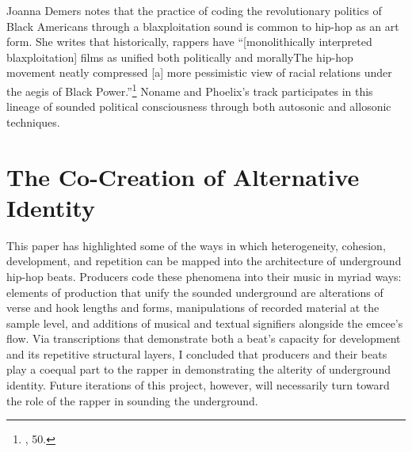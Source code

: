 Joanna Demers notes that the practice of coding the revolutionary politics of Black Americans through a blaxploitation sound is common to hip-hop as an art form. She writes that historically, rappers have ``[monolithically interpreted blaxploitation] films as unified both politically and morally\textellipsis The hip-hop movement neatly compressed [a] more pessimistic view of racial relations under the aegis of Black Power.''\footnote{\cite{joannademersSampling1970sHipHop2003}, 50.} Noname and Phoelix's track participates in this lineage of sounded political consciousness through both autosonic and allosonic techniques.

\section{The Co-Creation of Alternative Identity}
This paper has highlighted some of the ways in which heterogeneity, cohesion, development, and repetition can be mapped into the architecture of underground hip-hop beats. Producers code these phenomena into their music in myriad ways: elements of production that unify the sounded underground are alterations of verse and hook lengths and forms, manipulations of recorded material at the sample level, and additions of musical and textual signifiers alongside the emcee's flow. Via transcriptions that demonstrate both a beat's capacity for development and its repetitive structural layers, I concluded that producers and their beats play a coequal part to the rapper in demonstrating the alterity of underground identity. Future iterations of this project, however, will necessarily turn toward the role of the rapper in sounding the underground.